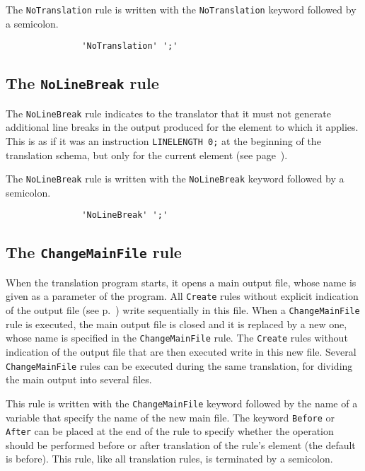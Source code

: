 The {\tt NoTranslation} rule is
written with the {\tt NoTranslation} keyword followed by a semicolon.

\begin{verbatim}
               'NoTranslation' ';'
\end{verbatim}

\subsection{The {\tt NoLineBreak} rule}
\label{nolinebreak}

The {\tt NoLineBreak} rule indicates to the translator that it must
not generate additional line breaks in the output produced for the element
to which it applies.  This is as if it was an instruction {\tt LINELENGTH 0;}
at the beginning of the translation schema, but only for the current
element (see page~\pageref{linelength}).

The {\tt NoLineBreak} rule is
written with the {\tt NoLineBreak} keyword followed by a semicolon.

\begin{verbatim}
               'NoLineBreak' ';'
\end{verbatim}

\subsection{The {\tt ChangeMainFile} rule}
\label{changemainfile}

When the translation program starts, it opens a main output file,
whose name is given as a parameter of the program. All {\tt Create}
rules without explicit indication of the output file (see p.~\pageref{create})
write sequentially in this file. When a {\tt ChangeMainFile} rule is
executed, the main output file is closed and it is replaced by a new
one, whose name is specified in the {\tt ChangeMainFile} rule. The
{\tt Create} rules without indication of the output file that are
then executed write in this new file. Several {\tt ChangeMainFile}
rules can be executed during the same translation, for dividing the
main output into several files.

This rule is written with the {\tt ChangeMainFile} keyword followed by
the name of a variable that specify the name of the new main file. The
keyword {\tt Before} or {\tt After} can be placed at the end of the rule
to specify whether the operation should be performed before or after
translation of the rule's element (the default is before). This rule,
like all translation rules, is terminated by a semicolon.

